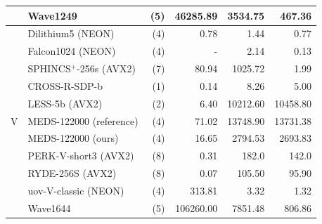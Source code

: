 \documentclass[11pt,a4paper]{report}
\theoremstyle{definition}
\begin{document}
\begin{table}
{\begin{tabular}{p{1.1cm}lrrrr}
                          & Wave1249~\cite{banegas2023wave}                    & (5)          & 46285.89        & 3534.75       & 467.36          \\
      \midrule
      \multirow{11}{*}{V}
                          & Dilithium5 (NEON)~\cite{becker2021neon}            & (4)          & 0.78            & 1.44          & 0.77            \\
                          & Falcon1024 (NEON)~\cite{nguyen2023fast}            & (4)          & -               & 2.14          & 0.13            \\
                          & SPHINCS$^+$-256s (AVX2)~\cite{aumasson2022sphincs} & (7)          & 80.94           & 1025.72       & 1.99            \\
      \addlinespace[0.5em]
                          & CROSS-R-SDP-b~\cite{baldi2024cross}                & (1)          & 0.14            & 8.26          & 5.00            \\
                          & LESS-5b (AVX2)~\cite{baldi2024less}                & (2)          & 6.40            & 10212.60      & 10458.80        \\
                          & MEDS-122000 (reference)                            & (4)          & 71.02           & 13748.90      & 13731.38        \\
                          & MEDS-122000 (ours)                                 & (4)          & 16.65           & 2794.53       & 2693.83         \\
                          & PERK-V-short3 (AVX2)~\cite{aaraj2023perk}          & (8)          & 0.31            & 182.0         & 142.0           \\
                          & RYDE-256S (AVX2)~\cite{aragon2023ryde}             & (8)          & 0.07            & 105.50        & 95.90           \\
                          & uov-V-classic (NEON)~\cite{beullens2023uov}        & (4)          & 313.81          & 3.32          & 1.32            \\
                          & Wave1644~\cite{banegas2023wave}                    & (5)          & 106260.00       & 7851.48       & 806.86          \\
      \bottomrule
    \end{tabular}
  }
  \label{tab:codebasedcomparison}
\end{table}
\end{document}
